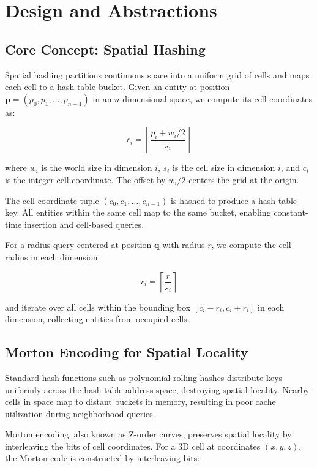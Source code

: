 \documentclass[11pt]{article}
\begin{document}
\section{Design and Abstractions}

\subsection{Core Concept: Spatial Hashing}

Spatial hashing partitions continuous space into a uniform grid of cells and maps each cell to a hash table bucket. Given an entity at position $\mathbf{p} = (p_0, p_1, \ldots, p_{n-1})$ in an $n$-dimensional space, we compute its cell coordinates as:

\begin{equation}
c_i = \left\lfloor \frac{p_i + w_i/2}{s_i} \right\rfloor
\end{equation}

where $w_i$ is the world size in dimension $i$, $s_i$ is the cell size in dimension $i$, and $c_i$ is the integer cell coordinate. The offset by $w_i/2$ centers the grid at the origin.

The cell coordinate tuple $(c_0, c_1, \ldots, c_{n-1})$ is hashed to produce a hash table key. All entities within the same cell map to the same bucket, enabling constant-time insertion and cell-based queries.

For a radius query centered at position $\mathbf{q}$ with radius $r$, we compute the cell radius in each dimension:

\begin{equation}
r_i = \left\lceil \frac{r}{s_i} \right\rceil
\end{equation}

and iterate over all cells within the bounding box $[c_i - r_i, c_i + r_i]$ in each dimension, collecting entities from occupied cells.

\subsection{Morton Encoding for Spatial Locality}

Standard hash functions such as polynomial rolling hashes distribute keys uniformly across the hash table address space, destroying spatial locality. Nearby cells in space map to distant buckets in memory, resulting in poor cache utilization during neighborhood queries.

Morton encoding, also known as Z-order curves, preserves spatial locality by interleaving the bits of cell coordinates. For a 3D cell at coordinates $(x, y, z)$, the Morton code is constructed by interleaving bits:
\end{document}
